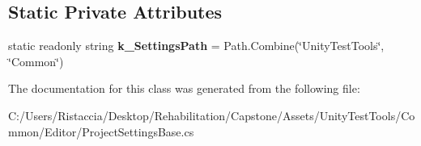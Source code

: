 \subsection*{Static Private Attributes}
\begin{DoxyCompactItemize}
\item 
\mbox{\label{class_unity_test_1_1_project_settings_base_a90088fa1013f8a69eb975c30dbeaae60}} 
static readonly string {\bfseries k\+\_\+\+Settings\+Path} = Path.\+Combine(\char`\"{}Unity\+Test\+Tools\char`\"{}, \char`\"{}Common\char`\"{})
\end{DoxyCompactItemize}


The documentation for this class was generated from the following file\+:\begin{DoxyCompactItemize}
\item 
C\+:/\+Users/\+Ristaccia/\+Desktop/\+Rehabilitation/\+Capstone/\+Assets/\+Unity\+Test\+Tools/\+Common/\+Editor/Project\+Settings\+Base.\+cs\end{DoxyCompactItemize}
